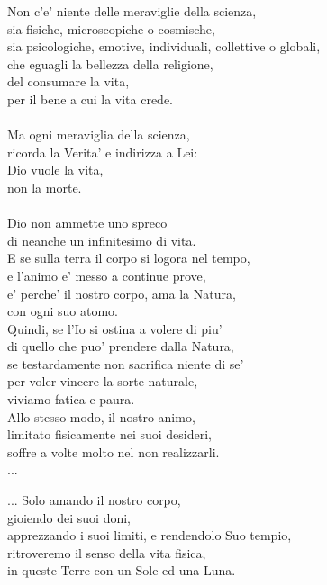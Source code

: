 \begin{haiku}
    Non c'e' niente delle meraviglie della scienza,\\
    sia fisiche, microscopiche o cosmische,\\
    sia psicologiche, emotive, individuali, collettive o globali,\\
    che eguagli la bellezza della religione,\\
    del consumare la vita,\\
    per il bene a cui la vita crede.\\
    \leavevmode\\
    Ma ogni meraviglia della scienza,\\
    ricorda la Verita' e indirizza a Lei:\\
    Dio vuole la vita,\\
    non la morte.\\
    \leavevmode\\
    Dio non ammette uno spreco\\
    di neanche un infinitesimo di vita.\\
    E se sulla terra il corpo si logora nel tempo,\\
    e l'animo e' messo a continue prove,\\
    e' perche' il nostro corpo, ama la Natura,\\
    con ogni suo atomo.\\
    Quindi, se l'Io si ostina a volere di piu'\\
    di quello che puo' prendere dalla Natura,\\
    se testardamente non sacrifica niente di se'\\
    per voler vincere la sorte naturale,\\
    viviamo fatica e paura.\\
    Allo stesso modo, il nostro animo, \\
    limitato fisicamente nei suoi desideri,\\
    soffre a volte molto nel non realizzarli.\\
    ...\\
\end{haiku}

\begin{haiku}
    ... Solo amando il nostro corpo,\\
    gioiendo dei suoi doni,\\
    apprezzando i suoi limiti,
    e rendendolo Suo tempio,\\
    ritroveremo il senso della vita fisica,\\
    in queste Terre con un Sole ed una Luna.\\
\end{haiku}


